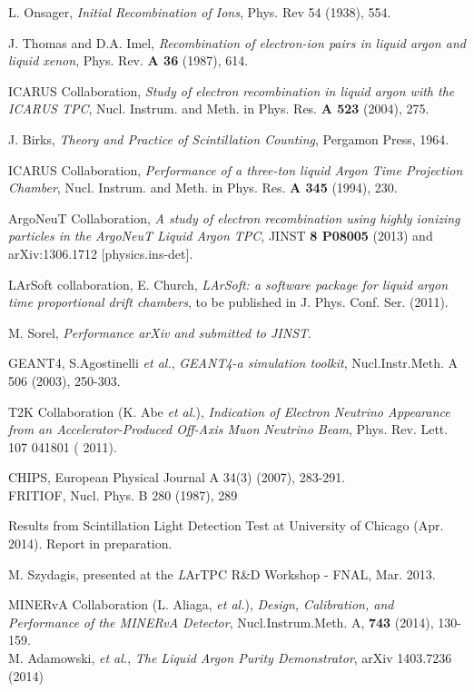 \documentclass[DIV=calc, paper=a4, fontsize=10pt, twocolumn]{scrartcl}	 %
\begin{document}
\begin{thebibliography}{00}
{ L. Onsager,
\emph{Initial Recombination of Ions}, Phys. Rev 54 (1938), 554.

J. Thomas and D.A. Imel, 
\emph{Recombination of electron-ion pairs in liquid argon and liquid xenon},
Phys. Rev. {\bf A 36} (1987), 614.

 ICARUS Collaboration,
\emph{Study of electron recombination in liquid argon with the ICARUS TPC},
Nucl. Instrum. and Meth. in Phys. Res. {\bf  A 523} (2004), 275.

 J. Birks, 
 \emph{Theory and Practice of Scintillation Counting}, Pergamon Press, 1964.

 ICARUS Collaboration,
\emph{Performance of a three-ton liquid Argon Time Projection Chamber},
Nucl. Instrum. and Meth. in Phys. Res. {\bf  A 345} (1994), 230.

 ArgoNeuT Collaboration,
\emph{A study of electron recombination using highly ionizing particles in the ArgoNeuT Liquid Argon TPC},
  JINST {\bf 8 P08005} (2013) and arXiv:1306.1712 [physics.ins-det].

 LArSoft collaboration, E. Church, 
\emph{LArSoft: a software package for liquid argon time proportional
drift chambers}, to be published in J. Phys. Conf. Ser. (2011).

 M. Sorel, \emph{Performance arXiv and submitted to JINST}.

 GEANT4, S.Agostinelli {\it et al.},
\emph{GEANT4-a simulation toolkit}, Nucl.Instr.Meth. A 506 (2003), 250-303.

 T2K Collaboration (K. Abe {\it et al.}), \emph{Indication of Electron Neutrino Appearance from an Accelerator-Produced Off-Axis Muon Neutrino Beam}, Phys. Rev. Lett. 107 041801 ( 2011).

 CHIPS, European Physical Journal A  34(3) (2007), 283-291. \\
FRITIOF, Nucl. Phys. B 280 (1987), 289

 Results from Scintillation Light Detection Test at University of Chicago (Apr. 2014). Report in preparation.

 M. Szydagis, presented at the {\emph LArTPC R\&D Workshop} - FNAL, Mar. 2013.

 MINERvA Collaboration (L. Aliaga, {\it et al.}), \emph{Design, Calibration, and Performance of the MINERvA Detector}, Nucl.Instrum.Meth. A, {\bf 743} (2014), 130-159. \\ 
 
  M. Adamowski, {\it et al.}, \emph{The Liquid Argon Purity Demonstrator}, arXiv 1403.7236 (2014) \\
 
}
\end{thebibliography}
\clearpage
\end{document}
